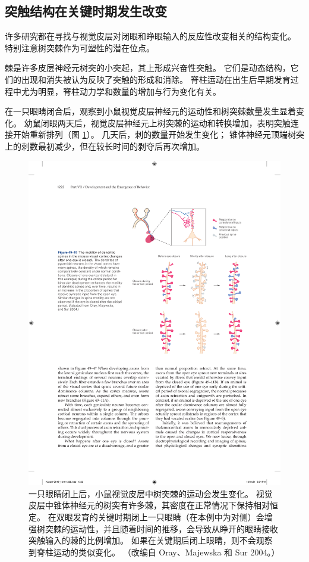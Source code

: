 \subsection{突触结构在关键时期发生改变}
许多研究都在寻找与视觉皮层对闭眼和睁眼输入的反应性改变相关的结构变化。 特别注意树突棘作为可塑性的潜在位点。

棘是许多皮层神经元树突的小突起，其上形成兴奋性突触。 它们是动态结构，它们的出现和消失被认为反映了突触的形成和消除。 脊柱运动在出生后早期发育过程中尤为明显，脊柱动力学和数量的增加与行为变化有关。

在一只眼睛闭合后，观察到小鼠视觉皮层神经元的运动性和树突棘数量发生显着变化。 
幼鼠闭眼两天后，视觉皮层神经元上树突棘的运动和转换增加，表明突触连接开始重新排列（图 \ref{fig:49_10}）。 
几天后，刺的数量开始发生变化； 锥体神经元顶端树突上的刺数最初减少，但在较长时间的剥夺后再次增加。

\begin{figure}[htbp]
	\centering
	\includegraphics[width=0.7\linewidth]{chap49/fig_49_10}
	\caption{一只眼睛闭上后，小鼠视觉皮层中树突棘的运动会发生变化。 视觉皮层中锥体神经元的树突有许多棘，其密度在正常情况下保持相对恒定。 在双眼发育的关键时期闭上一只眼睛（在本例中为对侧）会增强树突棘的运动性，并且随着时间的推移，会导致从睁开的眼睛接收突触输入的棘的比例增加。 如果在关键期后闭上眼睛，则不会观察到脊柱运动的类似变化。 （改编自 Oray、Majewska 和 Sur 2004。）}
	\label{fig:49_10}
\end{figure}

